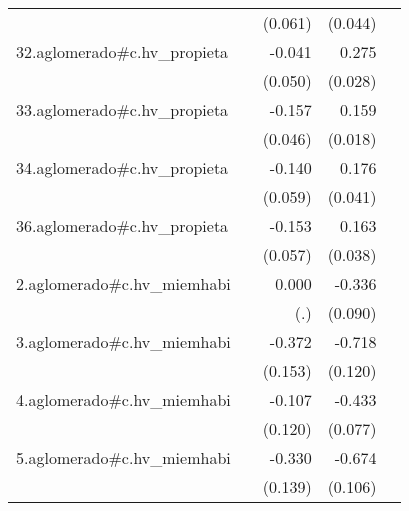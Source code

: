 {\begin{longtable}{l*{4}{D{.}{.}{-1}}}
            &                     &     (0.061)         &     (0.044)         &                     \\
\addlinespace
32.aglomerado#c.hv\_propieta&                     &      -0.041         &       0.275\sym{***}&                     \\
            &                     &     (0.050)         &     (0.028)         &                     \\
\addlinespace
33.aglomerado#c.hv\_propieta&                     &      -0.157\sym{***}&       0.159\sym{***}&                     \\
            &                     &     (0.046)         &     (0.018)         &                     \\
\addlinespace
34.aglomerado#c.hv\_propieta&                     &      -0.140\sym{*}  &       0.176\sym{***}&                     \\
            &                     &     (0.059)         &     (0.041)         &                     \\
\addlinespace
36.aglomerado#c.hv\_propieta&                     &      -0.153\sym{**} &       0.163\sym{***}&                     \\
            &                     &     (0.057)         &     (0.038)         &                     \\
\addlinespace
2.aglomerado#c.hv\_miemhabi&                     &       0.000         &      -0.336\sym{***}&                     \\
            &                     &         (.)         &     (0.090)         &                     \\
\addlinespace
3.aglomerado#c.hv\_miemhabi&                     &      -0.372\sym{*}  &      -0.718\sym{***}&                     \\
            &                     &     (0.153)         &     (0.120)         &                     \\
\addlinespace
4.aglomerado#c.hv\_miemhabi&                     &      -0.107         &      -0.433\sym{***}&                     \\
            &                     &     (0.120)         &     (0.077)         &                     \\
\addlinespace
5.aglomerado#c.hv\_miemhabi&                     &      -0.330\sym{*}  &      -0.674\sym{***}&                     \\
            &                     &     (0.139)         &     (0.106)         &                     \\

\end{longtable}}
